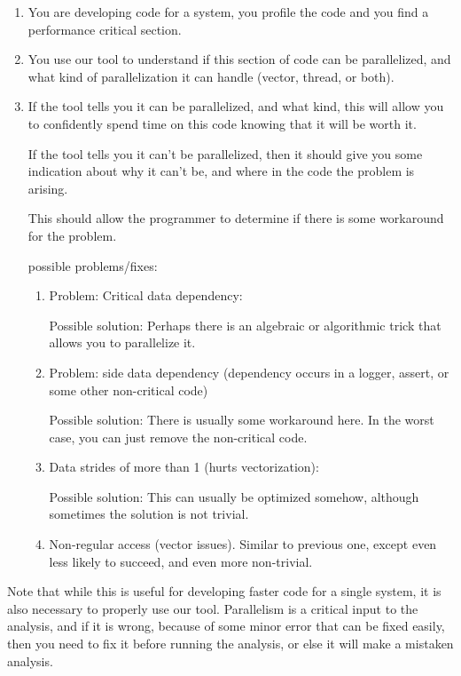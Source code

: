 \documentclass[12pt,twoside]{reedthesis}
\begin{document}
		\begin{enumerate}
			\item
			You are developing code for a system, you profile the code and you find a performance critical section.
			\item You use our tool to understand if this section of code can be parallelized, and what kind of parallelization it can handle (vector, thread, or both).

			\item If the tool tells you it can be parallelized, and what kind, this will allow you to confidently spend time on this code knowing that it will be worth it.

			If the tool tells you it can't be parallelized, then it should give you some indication about why it can't be, and where in the code the problem is arising.

			This should allow the programmer to determine if there is some workaround for the problem.

			possible problems/fixes:

			\begin{enumerate}
				\item Problem: Critical data dependency:

				Possible solution: Perhaps there is an algebraic or algorithmic trick that allows you to parallelize it.

				\item Problem: side data dependency (dependency occurs in a logger, assert, or some other non-critical code)

				Possible solution: There is usually some workaround here. In the worst case, you can just remove the non-critical code.

				\item Data strides of more than 1 (hurts vectorization):

				Possible solution: This can usually be optimized somehow, although sometimes the solution is not trivial.

				\item Non-regular access (vector issues). Similar to previous one, except even less likely to succeed, and even more non-trivial.
			\end{enumerate}

		\end{enumerate}

		Note that while this is useful for developing faster code for a single system, it is also necessary to properly use our tool. Parallelism is a critical input to the analysis, and if it is wrong, because of some minor error that can be fixed easily, then you need to fix it before running the analysis, or else it will make a mistaken analysis.
\end{document}

